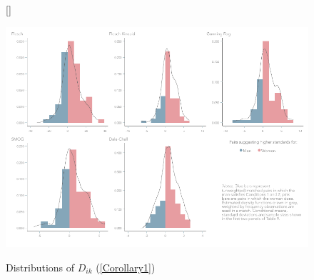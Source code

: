 \begin{figure}
	
	[\FBwidth]
	{
		\caption{Distributions of \(D_{ik}\) (\autoref{Corollary1})}\label{figure8_base}
	}
	{
		\includegraphics[width=12.3cm]{0-images/generated/Figure-5-base.pdf}
	}
\end{figure}